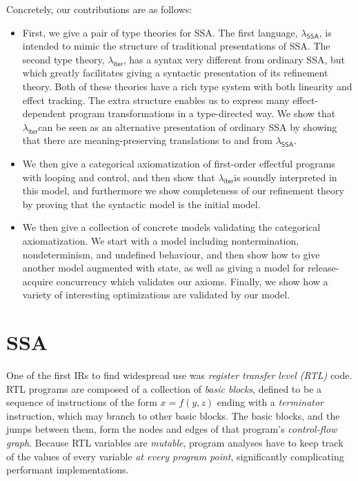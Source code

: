 \documentclass[acmsmall,screen,review]{acmart}
\newcommand{\ms}[1]{\ensuremath{\mathsf{#1}}}
\newcommand{\subiterexp}{\texorpdfstring{\(\lambda_{\ms{iter}}\)}{lambda-iter}}
\newcommand{\isotopessa}{\(\lambda_{\ms{SSA}}\)}
\begin{document}
Concretely, our contributions are as follows:

\begin{itemize}
\item First, we give a pair of type theories for SSA. The first
  language, \isotopessa, is intended to mimic the structure of
  traditional presentations of SSA. The second type theory,
  \subiterexp, has a syntax very different from ordinary SSA, but
  which greatly facilitates giving a syntactic presentation of its
  refinement theory. Both of these theories have a rich type system
  with both linearity and effect tracking. The extra structure enables
  us to express many effect-dependent program transformations in a
  type-directed way. We show that \subiterexp can be seen as an
  alternative presentation of ordinary SSA by showing that there are
  meaning-preserving translations to and from \isotopessa.
\item We then give a categorical axiomatization of first-order
  effectful programs with looping and control, and then show that
  \subiterexp is soundly interpreted in this model, and furthermore we
  show completeness of our refinement theory by proving that the
  syntactic model is the initial model.
\item We then give a collection of concrete models validating the
  categorical axiomatization. We start with a model including
  nontermination, nondeterminism, and undefined behaviour, and then
  show how to give another model augmented with state, as well as
  giving a model for release-acquire concurrency which validates our
  axioms. Finally, we show how a variety of interesting optimizations
  are validated by our model.
\end{itemize}

\section{SSA}

\label{sec:ssa-intro}

One of the first IRs to find widespread use was \emph{register transfer level (RTL)} code. RTL
programs are composed of a collection of \emph{basic blocks}, defined to be a sequence of
instructions of the form $x = f(y, z)$ ending with a \emph{terminator} instruction, which may branch
to other basic blocks. The basic blocks, and the jumps between them, form the nodes and edges of
that program's \emph{control-flow graph}. Because RTL variables are \emph{mutable}, program analyses
have to keep track of the values of every variable \emph{at every program point}, significantly
complicating performant implementations.
\end{document}
